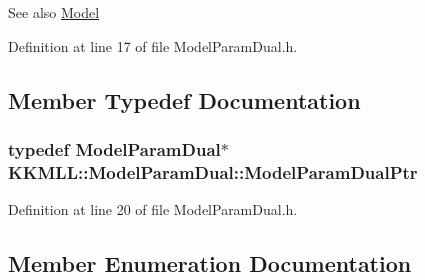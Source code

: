\begin{DoxySeeAlso}{See also}
\hyperlink{class_k_k_m_l_l_1_1_model}{Model} 
\end{DoxySeeAlso}


Definition at line 17 of file Model\+Param\+Dual.\+h.



\subsection{Member Typedef Documentation}
\subsubsection[{\texorpdfstring{Model\+Param\+Dual\+Ptr}{ModelParamDualPtr}}]{\setlength{\rightskip}{0pt plus 5cm}typedef {\bf Model\+Param\+Dual}$\ast$ {\bf K\+K\+M\+L\+L\+::\+Model\+Param\+Dual\+::\+Model\+Param\+Dual\+Ptr}}\hypertarget{class_k_k_m_l_l_1_1_model_param_dual_a83c76ba9be647e769ae21200719f9a23}{}\label{class_k_k_m_l_l_1_1_model_param_dual_a83c76ba9be647e769ae21200719f9a23}


Definition at line 20 of file Model\+Param\+Dual.\+h.



\subsection{Member Enumeration Documentation}
